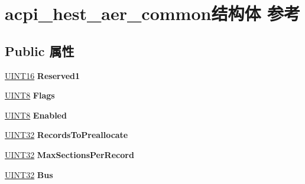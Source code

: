 \hypertarget{structacpi__hest__aer__common}{}\section{acpi\+\_\+hest\+\_\+aer\+\_\+common结构体 参考}
\label{structacpi__hest__aer__common}
\subsection*{Public 属性}
\begin{DoxyCompactItemize}
\item 
\mbox{\label{structacpi__hest__aer__common_a4c1bfbfa281e5ecd7d0c018344c81d25}} 
\hyperlink{_processor_bind_8h_a09f1a1fb2293e33483cc8d44aefb1eb1}{U\+I\+N\+T16} {\bfseries Reserved1}
\item 
\mbox{\label{structacpi__hest__aer__common_a24d13787a71e6ede46cc1635113e0181}} 
\hyperlink{_processor_bind_8h_ab27e9918b538ce9d8ca692479b375b6a}{U\+I\+N\+T8} {\bfseries Flags}
\item 
\mbox{\label{structacpi__hest__aer__common_af83bdef659cdf4fdd7da4ad65f8376c6}} 
\hyperlink{_processor_bind_8h_ab27e9918b538ce9d8ca692479b375b6a}{U\+I\+N\+T8} {\bfseries Enabled}
\item 
\mbox{\label{structacpi__hest__aer__common_aa1c0f7603fd0146f11d7dedb277c5bf9}} 
\hyperlink{_processor_bind_8h_ae1e6edbbc26d6fbc71a90190d0266018}{U\+I\+N\+T32} {\bfseries Records\+To\+Preallocate}
\item 
\mbox{\label{structacpi__hest__aer__common_a07724b5df35de311cad6d7119eda465b}} 
\hyperlink{_processor_bind_8h_ae1e6edbbc26d6fbc71a90190d0266018}{U\+I\+N\+T32} {\bfseries Max\+Sections\+Per\+Record}
\item 
\mbox{\label{structacpi__hest__aer__common_ac6ba6e04c5dcbdf94e5d9be999c56fd0}} 
\hyperlink{_processor_bind_8h_ae1e6edbbc26d6fbc71a90190d0266018}{U\+I\+N\+T32} {\bfseries Bus}
\item 
\mbox{\label{structacpi__hest__aer__common_aa1851449c17af5ef6094be881d1b4fbd}} 

\end{DoxyCompactItemize}
